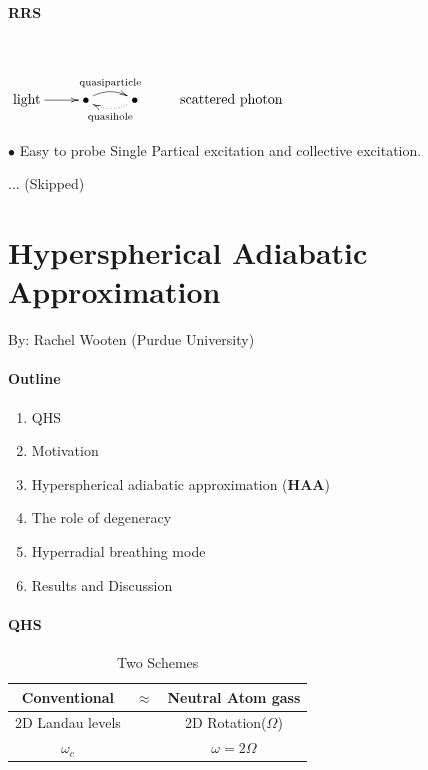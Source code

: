 \documentclass{article}
\numberwithin{equation}{subsection} %
\theoremstyle{definition}
\begin{document}
\paragraph{RRS}
$ $ %

$ \xymatrix{
    \text{light}\ar[r] &
    \bullet\ar@/^/[r]^{\text{quasiparticle}}
                \ar@/_/@{<.}[r]_{\text{quasihole}} & 
    \bullet & \text{scattered photon}
}$

$\bullet$ Easy to probe Single Partical excitation and collective
excitation.

... (Skipped)

\section{Hyperspherical Adiabatic Approximation}
\label{sec:Hyperspherical-adiabatic-Approximation}

By: Rachel Wooten (Purdue University)

\paragraph{Outline}
\begin{enumerate}
    \item QHS
    \item Motivation
    \item Hyperspherical adiabatic approximation (\textbf{HAA})
    \item The role of degeneracy
    \item Hyperradial breathing mode
    \item Results and Discussion
\end{enumerate}

\paragraph{QHS}
\begin{table}[H]
    \caption{Two Schemes}
    \centering
    \begin{tabular}{|ccc|}
        \hline
        Conventional     & $\approx$ & Neutral Atom gass \\
        \hline
        2D Landau levels &           & 2D Rotation($\Omega$) \\
        $\omega_c$       &           & $\omega= 2\Omega$ \\
        \hline
    \end{tabular}
\end{table}
\end{document}
